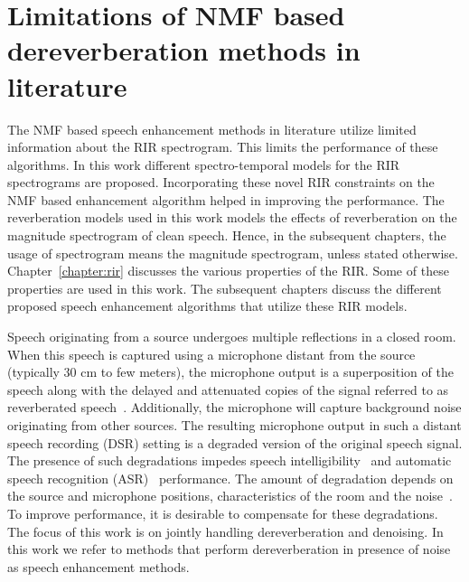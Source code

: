 \iffalse
\begin{itemize}
\item Reverberation methods: cost function, iterative procedure
\item Extending to noisy scenario - use of additive noise, extended model, results
\end{itemize}
\fi

\section{Limitations of NMF based dereverberation methods in literature}
The NMF based speech enhancement methods in literature utilize limited information about the RIR spectrogram.  This limits the performance of these algorithms. In this work different spectro-temporal models for the RIR spectrograms are proposed. Incorporating these novel RIR constraints on the NMF based enhancement algorithm helped in improving the performance. The reverberation models used in this work models the effects of reverberation on the magnitude spectrogram of clean speech. Hence, in the subsequent chapters, the usage of spectrogram means the magnitude spectrogram, unless stated otherwise. 
Chapter~\ref{chapter:rir} discusses the various properties of the RIR. Some of these properties are used in this work. The subsequent chapters discuss the different proposed speech enhancement algorithms that utilize these RIR models.  

\iffalse
\begin{itemize}
\item Most methods does not model RIR
\item Some methods use week constraints on RIR 
\item Thesis work is on incorporation various models for RIR in NMF based reverberation model
\item This resulted in improved enhancement and ASR results, proper RIR estimates 
\end{itemize}
\fi

\iffalse
Speech originating from a source undergoes multiple reflections in a closed room. When this speech is captured using a microphone distant from the source (typically 30 cm to few meters), the microphone output is a superposition of the speech along with the delayed and attenuated copies of the signal referred to as reverberated speech~\cite{naylor2010speech}. Additionally, the microphone will capture background noise originating from other sources. The resulting microphone output in such a distant speech recording (DSR) setting is a degraded version of the original speech signal. The presence of such degradations impedes speech intelligibility~\cite{kinoshita2016summary}  and automatic speech recognition (ASR)~\cite{barker2018fifth, barker2015third} performance. The amount of degradation depends on the source and microphone positions, characteristics of the room and the noise~\cite{naylor2010speech,kinoshita2016summary}. To improve performance, it is desirable to compensate for these degradations. The focus of this work is on jointly handling dereverberation and denoising. In this work we refer to methods that perform dereverberation in presence of noise as speech enhancement methods.

